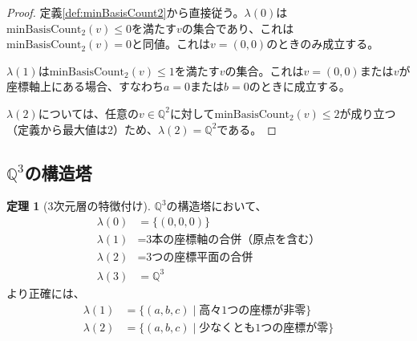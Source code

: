 \documentclass[a4paper,11pt]{ltjsarticle}
\theoremstyle{definition}
\newtheorem{theorem}[definition]{定理}
\begin{document}
\begin{proof}
定義\ref{def:minBasisCount2}から直接従う。$\lambda(0)$は$\mathrm{minBasisCount}_2(v) \leq 0$を満たす$v$の集合であり、これは$\mathrm{minBasisCount}_2(v) = 0$と同値。これは$v = (0, 0)$のときのみ成立する。

$\lambda(1)$は$\mathrm{minBasisCount}_2(v) \leq 1$を満たす$v$の集合。これは$v = (0, 0)$または$v$が座標軸上にある場合、すなわち$a = 0$または$b = 0$のときに成立する。

$\lambda(2)$については、任意の$v \in \mathbb{Q}^2$に対して$\mathrm{minBasisCount}_2(v) \leq 2$が成り立つ（定義から最大値は2）ため、$\lambda(2) = \mathbb{Q}^2$である。
\end{proof}

\begin{center}
\end{center}

\subsection{$\mathbb{Q}^3$の構造塔}

\begin{theorem}[3次元層の特徴付け]
$\mathbb{Q}^3$の構造塔において、
\begin{align*}
\lambda(0) &= \{(0, 0, 0)\} \\
\lambda(1) &= \text{3本の座標軸の合併（原点を含む）} \\
\lambda(2) &= \text{3つの座標平面の合併} \\
\lambda(3) &= \mathbb{Q}^3
\end{align*}
より正確には、
\begin{align*}
\lambda(1) &= \{(a,b,c) \mid \text{高々1つの座標が非零}\} \\
\lambda(2) &= \{(a,b,c) \mid \text{少なくとも1つの座標が零}\}
\end{align*}
\end{theorem}
\end{document}
